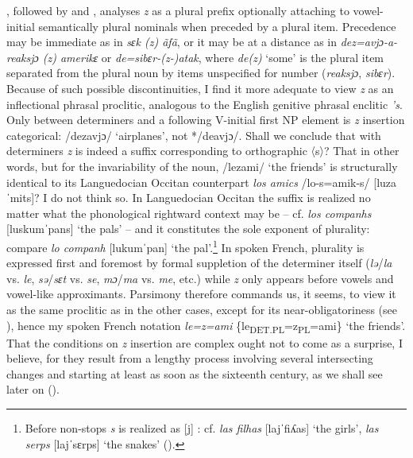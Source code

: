 \documentclass[output=paper]{langscibook}
\begin{document}
\citet{Gougenheim1938}, followed by \citet{Morin2005} and \citet{MorinKaye1982}, analyses \textit{z} as a plural prefix optionally attaching to vowel-initial semantically plural nominals when preceded by a plural item. Precedence may be immediate as in \textit{sɛk (z) ãfã}, or it may be at a distance as in \textit{dez=avjɔ-a-reaksjɔ (z) amerikɛ} or \textit{de=sibɛr-(z-)atak}, where \textit{de(z)} ‘some’ is the plural item separated from the plural noun by items unspecified for number (\textit{reaksjɔ}, \textit{sibɛr}). Because of such possible discontinuities, I find it more adequate to view \textit{z} as an inflectional phrasal proclitic, analogous to the English genitive phrasal enclitic \textit{’s}. Only between determiners and a following V-initial first NP element is \textit{z} insertion categorical: /dezavjɔ/ ‘airplanes’, not */deavjɔ/. Shall we conclude that with determiners \textit{z} is indeed a suffix corresponding to orthographic 〈s〉? That in other words, but for the invariability of the noun, /lezami/ ‘the friends’ is structurally identical to its Languedocian Occitan counterpart \textit{los amics} /lo-s=amik-s/ [luzaˈmits]? I do not think so. In Languedocian Occitan the suffix is realized no matter what the phonological rightward context may be -- cf. \textit{los companhs} [luskumˈpans] ‘the pals’ -- and it constitutes the sole exponent of plurality: compare \textit{lo companh} [lukumˈpan] ‘the pal’.\footnote{Before non-stops \textit{s} is realized as [j] : cf. \textit{las filhas} [lajˈfiʎas] ‘the girls’, \textit{las serps} [lajˈsɛrps] ‘the snakes’ (\citealt[39]{Alibèrt2000}).} In spoken French, plurality is expressed first and foremost by formal suppletion of the determiner itself (\textit{lə}/\textit{la} vs. \textit{le}, \textit{sə}/\textit{sɛt} vs. \textit{se}, \textit{mɔ}/\textit{ma} vs. \textit{me}, etc.) while \textit{z} only appears before vowels and vowel-like approximants. Parsimony therefore commands us, it seems, to view it as the same proclitic as in the other cases, except for its near-obligatoriness (see \citealt{Mallet2008}), hence my spoken French notation \textit{le=z=ami} \{le\textsubscript{DET.PL}=z\textsubscript{PL}=ami\} ‘the friends’. That the conditions on \textit{z} insertion are complex ought not to come as a surprise, I believe, for they result from a lengthy process involving several intersecting changes and starting at least as soon as the sixteenth century, as we shall see later on ().
\end{document}

